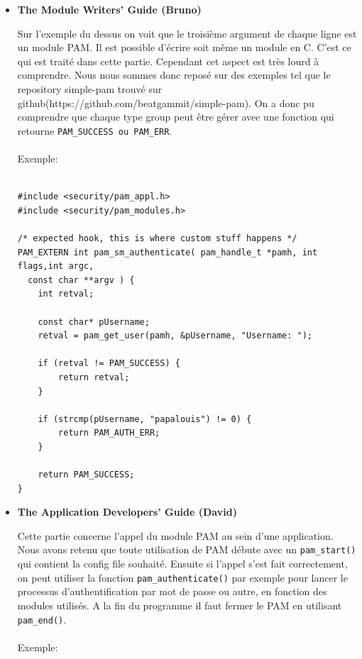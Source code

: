 \documentclass[french]{report}
\begin{document}
\begin{itemize}[label=\textbullet, font=\normalfont \color{blue}]
\vspace{0.5cm}

    \item{\textbf{The Module Writers' Guide (Bruno)}}

    \vspace{0.05cm}

Sur l’exemple du dessus on voit que le troisième argument de chaque ligne est
un module PAM. Il est possible d’écrire soit même un module en C. C’est ce qui
est traité dans cette partie. Cependant cet aspect est très lourd à comprendre.
Nous nous sommes donc reposé sur des exemples tel que le repository simple-pam
trouvé sur github(https://github.com/beatgammit/simple-pam). On a donc pu comprendre que chaque type group peut être
gérer avec une fonction qui retourne \texttt{PAM\_SUCCESS ou PAM\_ERR}.
\\ \\
    Exemple:

  \begin{verbatim}

#include <security/pam_appl.h>
#include <security/pam_modules.h>

/* expected hook, this is where custom stuff happens */
PAM_EXTERN int pam_sm_authenticate( pam_handle_t *pamh, int flags,int argc,
  const char **argv ) {
	int retval;

	const char* pUsername;
	retval = pam_get_user(pamh, &pUsername, "Username: ");

	if (retval != PAM_SUCCESS) {
		return retval;
	}

	if (strcmp(pUsername, "papalouis") != 0) {
		return PAM_AUTH_ERR;
	}

	return PAM_SUCCESS;
}
\end{verbatim}

\vspace{0.5cm}

    \item{\textbf{The Application Developers' Guide (David)}}

    \vspace{0.05cm}

  Cette partie concerne l’appel du module PAM au sein d’une application. Nous
  avons retenu que toute utilisation de PAM débute avec un \texttt{pam\_start()}
  qui contient la config file souhaité. Ensuite si l’appel s’est fait
  correctement, on peut utiliser la fonction \texttt{pam\_authenticate()} par
  exemple pour lancer le processus d’authentification par mot de passe ou
  autre, en fonction des modules utilisés. A la fin du programme il faut fermer
  le PAM en utilisant \texttt{pam\_end()}.
\\ \\
\newpage
    Exemple:


\end{itemize}
\end{document}
